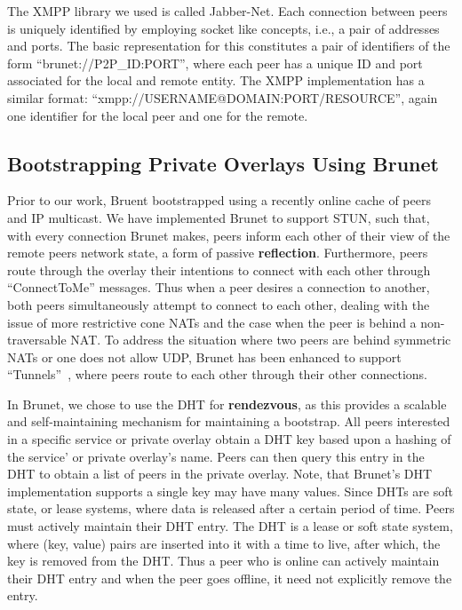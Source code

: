 \documentclass[conference]{IEEEtran}
\begin{document}
The XMPP library we used is called Jabber-Net.  Each connection between peers
is uniquely identified by employing socket like concepts, i.e., a pair of
addresses and ports.  The basic representation for this constitutes a pair of
identifiers of the form ``brunet://P2P\_ID:PORT'', where each peer has a unique
ID and port associated for the local and remote entity.  The XMPP
implementation has a similar format: ``xmpp://USERNAME@DOMAIN:PORT/RESOURCE'',
again one identifier for the local peer and one for the remote.

\subsection{Bootstrapping Private Overlays Using Brunet}
\label{brunet_bootstrapping}

Prior to our work, Bruent bootstrapped using a recently online cache of peers
and IP multicast.  We have implemented Brunet to support STUN, such that, with
every connection Brunet makes, peers inform each other of their view of the
remote peers network state, a form of passive \textbf{reflection}.
Furthermore, peers route through the overlay their intentions to connect with
each other through ``ConnectToMe'' messages.  Thus when a peer desires a
connection to another, both peers simultaneously attempt to connect to each
other, dealing with the issue of more restrictive cone NATs and the case when
the peer is behind a non-traversable NAT.  To address the situation where two
peers are behind symmetric NATs or one does not allow UDP, Brunet has been
enhanced to support ``Tunnels''~\cite{hpdc08_0}, where peers route to each
other through their other connections.

In Brunet, we chose to use the DHT for \textbf{rendezvous}, as this provides a
scalable and self-maintaining mechanism for maintaining a bootstrap. All peers
interested in a specific service or private overlay obtain a DHT key based upon
a hashing of the service' or private overlay's name.  Peers can then query this
entry in the DHT to obtain a list of peers in the private overlay.  Note, that
Brunet's DHT implementation supports a single key may have many values.  Since
DHTs are soft state, or lease systems, where data is released after a certain
period of time.  Peers must actively maintain their DHT entry.  The DHT is
a lease or soft state system, where (key, value) pairs are inserted into it
with a time to live, after which, the key is removed from the DHT.  Thus a
peer who is online can actively maintain their DHT entry and when the peer goes
offline, it need not explicitly remove the entry.
\end{document}
